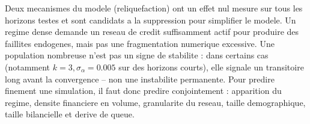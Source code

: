 \documentclass[11pt,a4paper]{article}
\begin{document}
Deux mecanismes du modele (reliquefaction) ont un effet nul mesure sur tous
les horizons testes et sont candidats a la suppression pour simplifier le
modele. Un regime dense demande un reseau de credit suffisamment actif pour
produire des faillites endogenes, mais pas une fragmentation numerique
excessive. Une population nombreuse n'est pas un signe de stabilite : dans
certains cas (notamment \(k=3, \sigma_\alpha=0.005\) sur des horizons courts),
elle signale un transitoire long avant la convergence -- non une instabilite permanente.
Pour predire finement une simulation, il faut donc predire conjointement :
apparition du regime, densite financiere en volume, granularite du reseau,
taille demographique, taille bilancielle et derive de queue.

\clearpage
{}
\begin{landscape}

\end{landscape}
\restoregeometry
\end{document}
